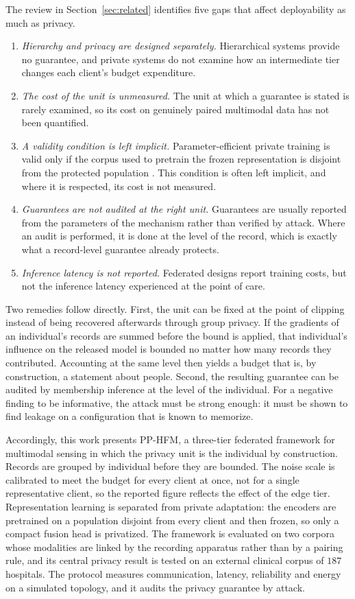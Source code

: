 The review in Section~\ref{sec:related} identifies five gaps that affect
deployability as much as privacy.
\begin{enumerate}
\item \emph{Hierarchy and privacy are designed separately.} Hierarchical
systems provide no guarantee, and private systems do not examine how an
intermediate tier changes each client's budget expenditure.
\item \emph{The cost of the unit is unmeasured.} The unit at which a guarantee
is stated is rarely examined, so its cost on genuinely paired multimodal data
has not been quantified.
\item \emph{A validity condition is left implicit.} Parameter-efficient private
training is valid only if the corpus used to pretrain the frozen
representation is disjoint from the protected population
\cite{ref12, ref13}. This condition is often left implicit, and where it is
respected, its cost is not measured.
\item \emph{Guarantees are not audited at the right unit.} Guarantees are
usually reported from the parameters of the mechanism rather than verified by
attack. Where an audit is performed, it is done at the level of the record,
which is exactly what a record-level guarantee already protects.
\item \emph{Inference latency is not reported.} Federated designs report
training costs, but not the inference latency experienced at the point of
care.
\end{enumerate}

Two remedies follow directly. First, the unit can be fixed at the point of
clipping instead of being recovered afterwards through group privacy. If the
gradients of an individual's records are summed before the bound is applied,
that individual's influence on the released model is bounded no matter how
many records they contributed. Accounting at the same level then yields a
budget that is, by construction, a statement about people. Second, the
resulting guarantee can be audited by membership inference at the level of the
individual. For a negative finding to be informative, the attack must be
strong enough: it must be shown to find leakage on a configuration that is
known to memorize.

Accordingly, this work presents PP-HFM, a three-tier federated framework for
multimodal sensing in which the privacy unit is the individual by construction.
Records are grouped by individual before they are bounded. The noise scale is
calibrated to meet the budget for every client at once, not for a single
representative client, so the reported figure reflects the effect of the edge
tier. Representation learning is separated from
private adaptation: the encoders are pretrained on a population disjoint from
every client and then frozen, so only a compact fusion head is privatized. The
framework is evaluated on two corpora whose modalities are linked by the
recording apparatus rather than by a pairing rule, and its central privacy
result is tested on an external clinical corpus of $187$ hospitals. The protocol measures
communication, latency, reliability and energy on a simulated topology, and it
audits the privacy guarantee by attack.

